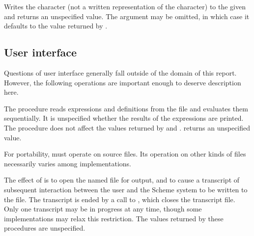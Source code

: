 \begin{entry}{%
}

Writes the character  (not a written representation of the
character) to the given  and returns an unspecified value.  The
 argument may be omitted, in which case it defaults to the value
returned by .

\end{entry}


\subsection{User interface}

Questions of user interface generally fall outside of the domain of this
report.  However, the following operations are important enough to
deserve description here.


\begin{entry}{%
}


 The  procedure reads
expressions and definitions from the file and evaluates them
sequentially.  It is unspecified whether the results of the expressions
are printed.  The  procedure does not affect the values
returned by  and .
 returns an unspecified value.

\begin{note}
For portability,  must operate on source files.
Its operation on other kinds of files necessarily varies among
implementations.
\end{note}
\end{entry}


\begin{entry}{%
\nopagebreak{}
}

 The effect of  is to open the named file
for output, and to cause a transcript of subsequent interaction between
the user and the Scheme system to be written to the file.  The
transcript is ended by a call to , which closes the
transcript file.  Only one transcript may be in progress at any time,
though some implementations may relax this restriction.  The values
returned by these procedures are unspecified.

\end{entry}
